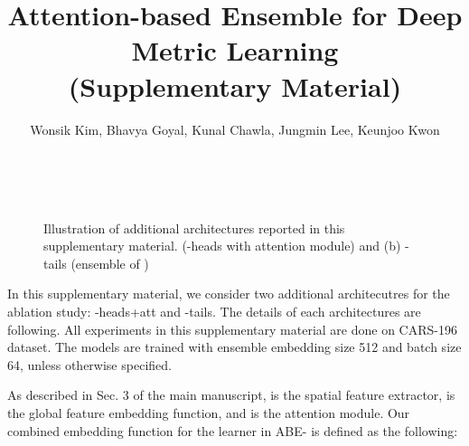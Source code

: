 \documentclass[runningheads]{llncs}
\begin{document}




\clearpage
\appendix
\setcounter{secnumdepth}{0}


\title{ \large{Attention-based Ensemble for Deep Metric Learning}\\ \large{(Supplementary Material)}}



\author{Wonsik Kim, Bhavya Goyal, Kunal Chawla, Jungmin Lee, Keunjoo Kwon}


\maketitle

\vspace{-7mm}
\begin{figure}[h]
\begin{center}
    \mbox{
\hspace{3mm}
    }
\end{center}
\vspace{-7mm}
\caption{Illustration of additional architectures reported in this supplementary material.  (-heads with attention module) and (b) -tails (ensemble of )
}
\label{fig:m_heads_and_m_way}
\end{figure}

\noindent
In this supplementary material, we consider two additional architecutres for the ablation study: -heads+att and -tails. The details of each architectures are following. All experiments in this supplementary material are done on CARS-196 dataset. The models are trained with ensemble embedding size 512 and batch size 64, unless otherwise specified.

As described in Sec. 3 of the main manuscript,  is the spatial feature extractor,  is the global feature embedding function, and  is the attention module.
Our combined embedding function  for the learner  in ABE- is defined as the following:
\end{document}

